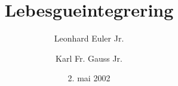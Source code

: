 \titlepage
\title{Lebesgueintegrering}
\author{Leonhard Euler Jr. \and Karl Fr. Gauss Jr.}
\date{2. mai 2002}
\maketitle

